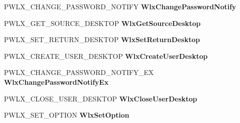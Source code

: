 \begin{DoxyCompactItemize}
\mbox{\label{struct___w_l_x___d_i_s_p_a_t_c_h___v_e_r_s_i_o_n__1__3_a9f587a0dd35b4e2019e5c584105875cf}} 
P\+W\+L\+X\+\_\+\+C\+H\+A\+N\+G\+E\+\_\+\+P\+A\+S\+S\+W\+O\+R\+D\+\_\+\+N\+O\+T\+I\+FY {\bfseries Wlx\+Change\+Password\+Notify}
\item 
\mbox{\label{struct___w_l_x___d_i_s_p_a_t_c_h___v_e_r_s_i_o_n__1__3_a54eb51880cb6cab47fc9d76777027a64}} 
P\+W\+L\+X\+\_\+\+G\+E\+T\+\_\+\+S\+O\+U\+R\+C\+E\+\_\+\+D\+E\+S\+K\+T\+OP {\bfseries Wlx\+Get\+Source\+Desktop}
\item 
\mbox{\label{struct___w_l_x___d_i_s_p_a_t_c_h___v_e_r_s_i_o_n__1__3_a02c15fcd577e14911c5ddc4c722e23fc}} 
P\+W\+L\+X\+\_\+\+S\+E\+T\+\_\+\+R\+E\+T\+U\+R\+N\+\_\+\+D\+E\+S\+K\+T\+OP {\bfseries Wlx\+Set\+Return\+Desktop}
\item 
\mbox{\label{struct___w_l_x___d_i_s_p_a_t_c_h___v_e_r_s_i_o_n__1__3_ab6758009c64c806f45f0e37e8abfd8f3}} 
P\+W\+L\+X\+\_\+\+C\+R\+E\+A\+T\+E\+\_\+\+U\+S\+E\+R\+\_\+\+D\+E\+S\+K\+T\+OP {\bfseries Wlx\+Create\+User\+Desktop}
\item 
\mbox{\label{struct___w_l_x___d_i_s_p_a_t_c_h___v_e_r_s_i_o_n__1__3_a51055b7e13c282343af960232be6d08b}} 
P\+W\+L\+X\+\_\+\+C\+H\+A\+N\+G\+E\+\_\+\+P\+A\+S\+S\+W\+O\+R\+D\+\_\+\+N\+O\+T\+I\+F\+Y\+\_\+\+EX {\bfseries Wlx\+Change\+Password\+Notify\+Ex}
\item 
\mbox{\label{struct___w_l_x___d_i_s_p_a_t_c_h___v_e_r_s_i_o_n__1__3_a92dbb4d6f68b254821a928b34949ea45}} 
P\+W\+L\+X\+\_\+\+C\+L\+O\+S\+E\+\_\+\+U\+S\+E\+R\+\_\+\+D\+E\+S\+K\+T\+OP {\bfseries Wlx\+Close\+User\+Desktop}
\item 
\mbox{\label{struct___w_l_x___d_i_s_p_a_t_c_h___v_e_r_s_i_o_n__1__3_a1ecc515c7d30bae89e4ce62b437349ff}} 
P\+W\+L\+X\+\_\+\+S\+E\+T\+\_\+\+O\+P\+T\+I\+ON {\bfseries Wlx\+Set\+Option}
\item 
\mbox{\label{struct___w_l_x___d_i_s_p_a_t_c_h___v_e_r_s_i_o_n__1__3_abdcf1cac399c4feb78f26ca51f2b79ae}} 

\end{DoxyCompactItemize}
